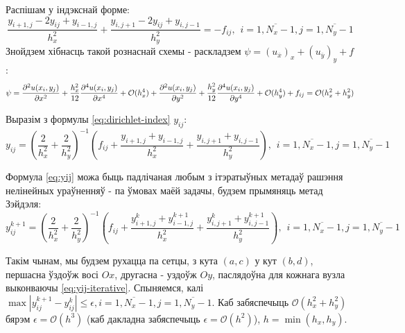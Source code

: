 Распішам у індэкснай форме:
\begin{equation} \label{eq:dirichlet-index}
    \frac{y_{i+1,j} - 2y_{ij} + y_{i-1,j}}{h_{x}^2} + \frac{y_{i,j+1} - 2y_{ij} + y_{i,j-1}}{h_{y}^2} = -f_{ij}, \hspace{5pt} i = \overline{1, N_x-1}, j = \overline{1, N_y-1}
\end{equation}
Знойдзем хібнасць такой рознаснай схемы - раскладзем $\psi = (u_{\overline{x}})_{x} + (u_{\overline{y}})_{y} + f$:
\begin{equation}
    \psi = \frac{\partial^2u(x_i, y_j)}{\partial x^2} + \frac{h_x^2}{12} \frac{\partial^4u(x_i, y_j)}{\partial x^4} + \mathcal{O}(h_x^4) + \\
    \frac{\partial^2u(x_i, y_j)}{\partial y^2} + \frac{h_y^2}{12} \frac{\partial^4u(x_i, y_j)}{\partial y^4} + \mathcal{O}(h_y^4) + f_{ij} = \mathcal{O}(h_{x}^2 + h_{y}^2)
\end{equation}

Выразім з формулы \eqref{eq:dirichlet-index} $y_{ij}$:
\begin{equation} \label{eq:yij}
    y_{ij} = (\frac{2}{h_{x}^2} + \frac{2}{h_{y}^2})^{-1} ( f_{ij} + \frac{y_{i+1,j} + y_{i-1,j}}{h_{x}^2} + \frac{y_{i,j+1} + y_{i,j-1}}{h_{y}^2} ), \hspace{5pt} i = \overline{1, N_x-1}, j = \overline{1, N_y-1}
\end{equation}

Формула \eqref{eq:yij} можа быць падлічаная любым з ітэратыўных метадаў рашэння нелінейных ураўненняў - па ўмовах маёй задачы, будзем прымяняць метад Зэйдэля:
\begin{equation} \label{eq:yij-iterative}
    y_{ij}^{k+1} = (\frac{2}{h_{x}^2} + \frac{2}{h_{y}^2})^{-1} ( f_{ij} + \frac{y_{i+1,j}^k + y_{i-1,j}^{k+1}}{h_{x}^2} + \frac{y_{i,j+1}^k + y_{i,j-1}^{k+1}}{h_{y}^2} ), \hspace{5pt} i = \overline{1, N_x-1}, j = \overline{1, N_y-1}
\end{equation}

Такім чынам, мы будзем рухацца па сетцы, з кута $(a, c)$ у кут $(b, d)$, першасна ўздоўж восі $Ox$, другасна - уздоўж $Oy$, паслядоўна для кожнага вузла выконваючы \eqref{eq:yij-iterative}. Спыняемся, калі $\max |y_{ij}^{k+1} - y_{ij}^k | \leq \epsilon, i = \overline{1, N_x-1}, j = \overline{1, N_y-1}$.
Каб забяспечыць $\mathcal{O}(h_{x}^2 + h_{y}^2)$ бярэм $\epsilon = \mathcal{O}(h^3)$ (каб дакладна забяспечыць $\epsilon = \mathcal{O}(h^2)$), $h = \min(h_x, h_y)$.


